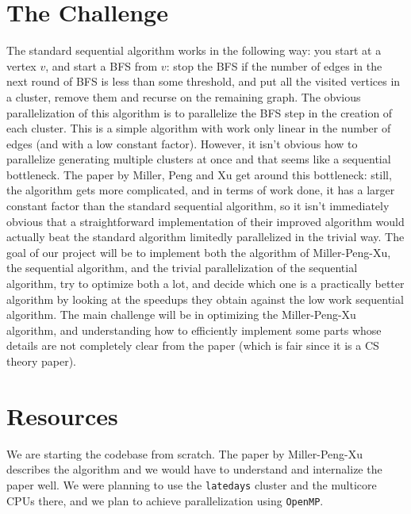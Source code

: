 \documentclass[11pt]{scrartcl}
\theoremstyle{plain}
\theoremstyle{definition}
\theoremstyle{remark}
\begin{document}
\section{The Challenge}
The standard sequential algorithm works in the following way: you start at a vertex $v$, and start a BFS from $v$: stop the BFS if the number of edges in the next round of BFS is less than some threshold, and put all the visited vertices in a cluster, remove them and recurse on the remaining graph. The obvious parallelization of this algorithm is to parallelize the BFS step in the creation of each cluster. This is a simple algorithm with work only linear in the number of edges (and with a low constant factor). However, it isn't obvious how to parallelize generating multiple clusters at once and that seems like a sequential bottleneck. The paper by Miller, Peng and Xu get around this bottleneck: still, the algorithm gets more complicated, and in terms of work done, it has a larger constant factor than the standard sequential algorithm, so it isn't immediately obvious that a straightforward implementation of their improved algorithm would actually beat the standard algorithm limitedly parallelized in the trivial way. The goal of our project will be to implement both the algorithm of Miller-Peng-Xu, the sequential algorithm, and the trivial parallelization of the sequential algorithm, try to optimize both a lot, and decide which one is a practically better algorithm by looking at the speedups they obtain against the low work sequential algorithm. The main challenge will be in optimizing the Miller-Peng-Xu algorithm, and understanding how to efficiently implement some parts whose details are not completely clear from the paper (which is fair since it is a CS theory paper).

\section{Resources}
We are starting the codebase from scratch. The paper by Miller-Peng-Xu describes the algorithm and we would have to understand and internalize the paper well. We were planning to use the \texttt{latedays} cluster and the multicore CPUs there, and we
plan to achieve parallelization using \texttt{OpenMP}.
\end{document}
